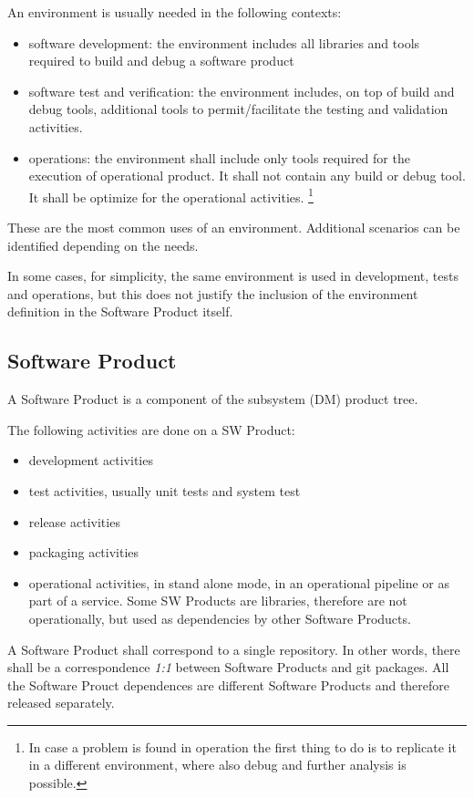 An environment is usually needed in the following contexts:

\begin{itemize}
\item software development: the environment includes all libraries and tools required to build and debug a software product
\item software test and verification: the environment includes, on top of build and debug tools, additional tools to permit/facilitate the testing and validation activities.
\item operations: the environment shall include only tools required for the execution of operational product. It shall not contain any build or debug tool. It shall be optimize for the operational activities. \footnote{In case a problem is found in operation the first thing to do is to replicate it in a different environment, where also debug and further analysis is possible.}
\end{itemize}

These are the most common uses of an environment. Additional scenarios can be identified depending on the needs.

In some cases, for simplicity, the same environment is used in development, tests and operations, but this does not justify the inclusion of the environment definition in the Software Product itself.


\subsection{Software Product} \label{sec:swprod}

A Software Product is a component of the subsystem (DM) product tree.

The following activities are done on a SW Product:
\begin{itemize}
\item development activities
\item test activities, usually unit tests and system test
\item release activities
\item packaging activities
\item operational activities, in stand alone mode, in an operational pipeline or as part of a service. Some SW Products are libraries, therefore are not operationally, but used as dependencies by other Software Products.
\end{itemize}

A Software Product shall correspond to a single repository. 
In other  words, there shall be a correspondence \textit{1:1} between Software Products and git packages.
All the Software Prouct dependences are different Software Products and therefore released separately.

